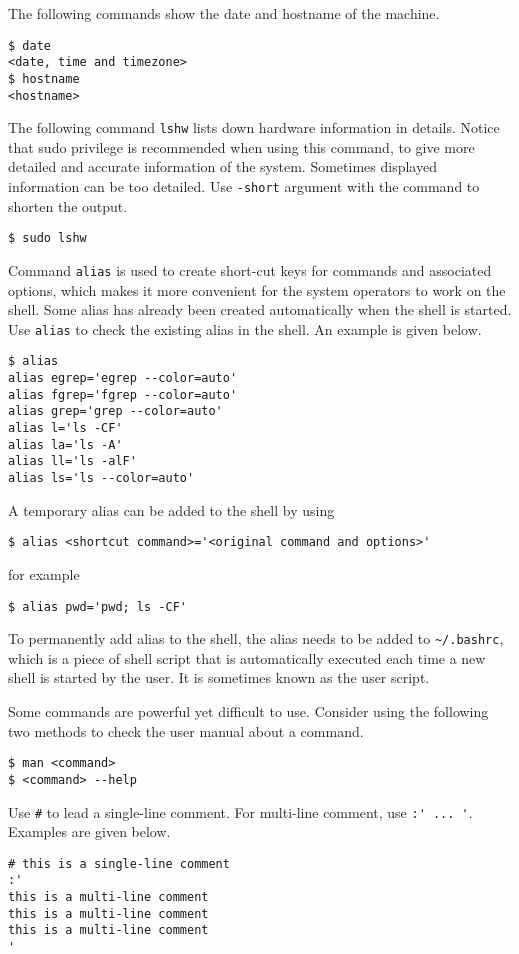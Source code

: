 The following commands show the date and hostname of the machine.
\begin{lstlisting}
$ date
<date, time and timezone>
$ hostname
<hostname>
\end{lstlisting}

The following command \verb|lshw| lists down hardware information in details. Notice that sudo privilege is recommended when using this command, to give more detailed and accurate information of the system. Sometimes displayed information can be too detailed. Use \verb|-short| argument with the command to shorten the output.
\begin{lstlisting}
$ sudo lshw
\end{lstlisting}

Command \verb|alias| is used to create short-cut keys for commands and associated options, which makes it more convenient for the system operators to work on the shell. Some alias has already been created automatically when the shell is started. Use \verb|alias| to check the existing alias in the shell. An example is given below.

\begin{lstlisting}
$ alias
alias egrep='egrep --color=auto'
alias fgrep='fgrep --color=auto'
alias grep='grep --color=auto'
alias l='ls -CF'
alias la='ls -A'
alias ll='ls -alF'
alias ls='ls --color=auto'
\end{lstlisting}

A temporary alias can be added to the shell by using
\begin{lstlisting}
$ alias <shortcut command>='<original command and options>'
\end{lstlisting}
for example
\begin{lstlisting}
$ alias pwd='pwd; ls -CF'
\end{lstlisting}

To permanently add alias to the shell, the alias needs to be added to \verb|~/.bashrc|, which is a piece of shell script that is automatically executed each time a new shell is started by the user. It is sometimes known as the user script.

Some commands are powerful yet difficult to use. Consider using the following two methods to check the user manual about a command.
\begin{lstlisting}
$ man <command>
$ <command> --help
\end{lstlisting}

Use \verb|#| to lead a single-line comment. For multi-line comment, use \verb|:' ... '|. Examples are given below.
\begin{lstlisting}
# this is a single-line comment
:'
this is a multi-line comment
this is a multi-line comment
this is a multi-line comment
'
\end{lstlisting}


